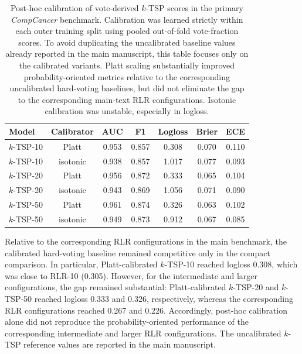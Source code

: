 \documentclass[11pt, a4paper]{article}
\newcommand{\stdtablefont}{\small}
\newcommand{\stdtablelayout}{%
  \stdtablefont
  \setlength{\tabcolsep}{4pt}
  \renewcommand{\arraystretch}{1.2}
}
\begin{document}
\begin{table}[!htbp]
\centering
\caption{Post-hoc calibration of vote-derived $k$-TSP scores in the primary \emph{CompCancer} benchmark. Calibration was learned strictly within each outer training split using pooled out-of-fold vote-fraction scores. To avoid duplicating the uncalibrated baseline values already reported in the main manuscript, this table focuses only on the calibrated variants. Platt scaling substantially improved probability-oriented metrics relative to the corresponding uncalibrated hard-voting baselines, but did not eliminate the gap to the corresponding main-text RLR configurations. Isotonic calibration was unstable, especially in logloss.}
\label{tab:calibrated_ktsp_world}
{\stdtablelayout
\begin{tabular}{lcccccc}\toprule
\textbf{Model} & \textbf{Calibrator} & \textbf{AUC} & \textbf{F1} & \textbf{Logloss} & \textbf{Brier} & \textbf{ECE} \\
\midrule
$k$-TSP-10 & Platt    & 0.953 & 0.857 & 0.308 & 0.070 & 0.110 \\
$k$-TSP-10 & isotonic & 0.938 & 0.857 & 1.017 & 0.077 & 0.093 \\
\midrule
$k$-TSP-20 & Platt    & 0.956 & 0.872 & 0.333 & 0.065 & 0.104 \\
$k$-TSP-20 & isotonic & 0.943 & 0.869 & 1.056 & 0.071 & 0.090 \\
\midrule
$k$-TSP-50 & Platt    & 0.961 & 0.874 & 0.326 & 0.063 & 0.102 \\
$k$-TSP-50 & isotonic & 0.949 & 0.873 & 0.912 & 0.067 & 0.085 \\
\bottomrule
\end{tabular}
}
\end{table}

Relative to the corresponding RLR configurations in the main benchmark, the calibrated hard-voting baseline remained competitive only in the compact comparison. In particular, Platt-calibrated $k$-TSP-10 reached logloss 0.308, which was close to RLR-10 (0.305). However, for the intermediate and larger configurations, the gap remained substantial: Platt-calibrated $k$-TSP-20 and $k$-TSP-50 reached logloss 0.333 and 0.326, respectively, whereas the corresponding RLR configurations reached 0.267 and 0.226. Accordingly, post-hoc calibration alone did not reproduce the probability-oriented performance of the corresponding intermediate and larger RLR configurations. The uncalibrated $k$-TSP reference values are reported in the main manuscript.
\end{document}
